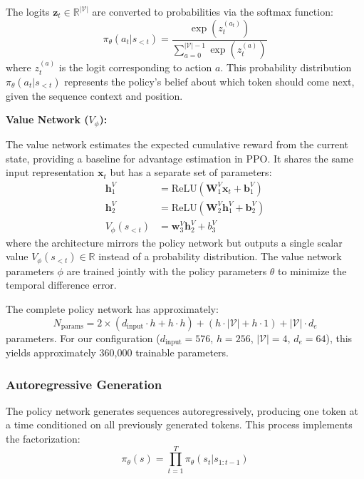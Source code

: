 \documentclass[conference]{IEEEtran}
\begin{document}
The logits $\mathbf{z}_t \in \mathbb{R}^{|\mathcal{V}|}$ are converted to probabilities via the softmax function:
\begin{equation}
\pi_\theta(a_t | s_{<t}) = \frac{\exp(z_t^{(a_t)})}{\sum_{a=0}^{|\mathcal{V}|-1} \exp(z_t^{(a)})}
\end{equation}
where $z_t^{(a)}$ is the logit corresponding to action $a$. This probability distribution $\pi_\theta(a_t | s_{<t})$ represents the policy's belief about which token should come next, given the sequence context and position.

\textbf{Value Network ($V_\phi$):}

The value network estimates the expected cumulative reward from the current state, providing a baseline for advantage estimation in PPO. It shares the same input representation $\mathbf{x}_t$ but has a separate set of parameters:
\begin{align}
\mathbf{h}_1^{V} &= \text{ReLU}(\mathbf{W}_1^{V} \mathbf{x}_t + \mathbf{b}_1^{V}) \\
\mathbf{h}_2^{V} &= \text{ReLU}(\mathbf{W}_2^{V} \mathbf{h}_1^{V} + \mathbf{b}_2^{V}) \\
V_\phi(s_{<t}) &= \mathbf{w}_3^{V} \mathbf{h}_2^{V} + b_3^{V}
\end{align}
where the architecture mirrors the policy network but outputs a single scalar value $V_\phi(s_{<t}) \in \mathbb{R}$ instead of a probability distribution. The value network parameters $\phi$ are trained jointly with the policy parameters $\theta$ to minimize the temporal difference error.

The complete policy network has approximately:
\begin{equation}
N_{\text{params}} = 2 \times (d_{\text{input}} \cdot h + h \cdot h) + (h \cdot |\mathcal{V}| + h \cdot 1) + |\mathcal{V}| \cdot d_e
\end{equation}
parameters. For our configuration ($d_{\text{input}} = 576$, $h = 256$, $|\mathcal{V}| = 4$, $d_e = 64$), this yields approximately 360,000 trainable parameters.

\subsubsection{Autoregressive Generation}

The policy network generates sequences autoregressively, producing one token at a time conditioned on all previously generated tokens. This process implements the factorization:
\begin{equation}
\pi_\theta(s) = \prod_{t=1}^{T} \pi_\theta(s_t | s_{1:t-1})
\end{equation}
\end{document}
